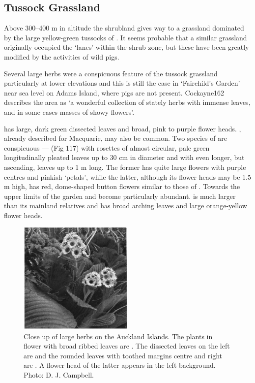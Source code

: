 \subsection{Tussock Grassland}

Above 300--400 m in altitude the shrubland gives way to a grassland dominated by the large yellow-green tussocks of .
It seems probable that a similar grassland originally occupied the `lanes' within the shrub zone, but these have been greatly modified by the activities of wild pigs.

Several large herbs were a conspicuous feature of the tussock grassland particularly at lower elevations and this is still the case in `Fairchild's Garden' near sea level on Adams Island, where pigs are not present.
Cockayne162 describes the area as `a wonderful collection of stately herbs with immense leaves, and in some cases masses of showy flowers'.

 has large, dark green dissected leaves and broad, pink to purple flower heads. , already described for Macquarie, may also be common.
Two species of  are conspicuous ---  (Fig 117) with rosettes of almost circular, pale green longitudinally pleated leaves up to 30 cm in diameter and  with even longer, but ascending, leaves up to 1 m long.
The former has quite large flowers with purple centres and pinkish `petals', while the latter, although its flower heads may be 1.5 m high, has red, dome-shaped button flowers similar to those of .
Towards the upper limits of the garden  and  become particularly abundant.  is much larger than its mainland relatives and has broad arching leaves and large orange-yellow flower heads.

\begin{figure}
	\includegraphics[width=0.5\textwidth]{graphics/figure117herbs.jpg}
	\centering
	\caption[Close up of large herbs on the Auckland Islands]{Close up of large herbs on the Auckland Islands.
	The plants in flower with broad ribbed leaves are .
	The dissected leaves on the left are  and the rounded leaves with toothed margins centre and right are .
	A flower head of the latter appears in the left background.
	Photo: D. J. Campbell.}%
	\label{fig:117herbs}
\end{figure}

